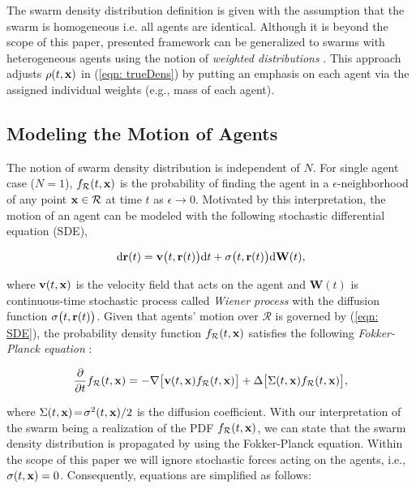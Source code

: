 \documentclass{ifacconf}
\newcommand{\Rconf}{{\mathcal R}}
\newcommand{\bx}{{\bf x}}
\newcommand{\br}{{\bf r}}
\newcommand{\bv}{{\bf v}}
\begin{document}
%
\begin{rem}
	The swarm density distribution definition is given with the assumption that the swarm is homogeneous i.e. all agents are identical. Although it is beyond the scope of this paper, presented framework can be generalized to swarms with heterogeneous agents using the notion of \emph{weighted distributions} \cite{patil2002weighted}. This approach adjusts $\rho(t,\bx)$ in (\ref{eqn: trueDens}) by putting an emphasis on each agent via the assigned individual weights (e.g., mass of each agent). 
\end{rem}


\subsection{Modeling the Motion of Agents} \label{sec: modeling}
The notion of swarm density distribution is independent of $N$. For single agent case ($N = 1$), $f_\Rconf(t,\bx)$ is the probability of finding the agent in a $\epsilon$-neighborhood of any point $\bx \in \Rconf$ at time $t$ as $\epsilon \rightarrow 0$.  Motivated by this interpretation, the motion of an agent  can be modeled with the following stochastic differential equation (SDE),

\begin{equation} \label{eqn: SDE}
	\textnormal{d}\br (t) = \bv\big(t,\br(t)\big)\textnormal{d}t + \sigma\big(t,\br(t)\big)\textnormal{d}\textbf{W}(t),
\end{equation}

where $\bv(t,\bx)$ is the  velocity field that acts on the agent and $\textbf{W}(t)$ is continuous-time stochastic process called \emph{Wiener process} with the diffusion function $\sigma\big(t,\br(t)\big)$. Given that agents' motion over $\Rconf$ is governed by (\ref{eqn: SDE}), the probability density function $f_\Rconf(t,\bx)$ satisfies the following \emph{Fokker-Planck equation} \cite{risken1984fokker}:

\begin{equation}
	{\frac {\partial }{\partial t}}f_\Rconf(t,\bx)=-\nabla\big[\bv(t,\bx)f_\Rconf(t,\bx)\big]+\Delta\big[\Sigma(t,\bx)f_\Rconf(t,\bx)\big],
\end{equation}

where $\Sigma(t,\bx) \!=\! \sigma^2 (t,\bx) / 2$ is the diffusion coefficient. 
With our interpretation of the swarm being a realization of the PDF $f_\Rconf(t,\bx)$,   we can state that the swarm density distribution is  propagated by using the Fokker-Planck equation. Within the scope of this paper we will ignore stochastic forces acting on the agents, i.e., $\sigma (t,\bx) = 0$. Consequently, equations are simplified as follows:
\end{document}
